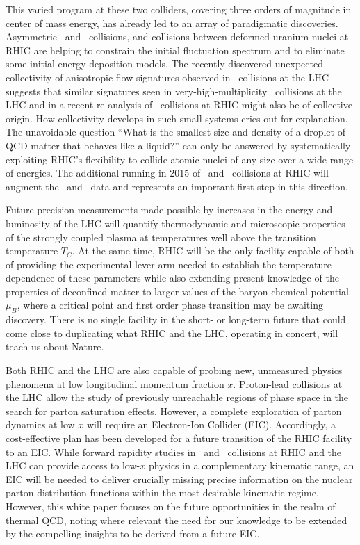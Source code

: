 This varied program at these two colliders, covering three orders of magnitude in center of mass energy, has already led to an array of paradigmatic discoveries. Asymmetric \CuAu\ and \HeAu\ collisions\cite{Huang:2012sc}, and collisions between deformed uranium nuclei at RHIC\cite{Wang:2014qxa} are helping to constrain the initial fluctuation spectrum and to eliminate some initial energy deposition models. The recently discovered unexpected collectivity of anisotropic flow signatures observed in
\pPb\ collisions at the LHC\cite{Abelev:2012ola,Aad:2013fja} suggests that similar signatures seen in very-high-multiplicity \pp\ collisions at the LHC\cite{Khachatryan:2010gv} and in a recent re-analysis of 
\dAu\ collisions at RHIC\cite{Adare:2013piz} might also be of collective origin. How collectivity develops in such small systems cries out for explanation. 
The unavoidable question ``What is the smallest size and density of a droplet of QCD matter that behaves like a liquid?'' can only be answered by systematically exploiting RHIC's flexibility to collide atomic nuclei of any size over a wide range of energies.
The additional running in 2015 of \pAu\ and \pAl\ collisions at RHIC will augment the \dAu\ and \HeAu\ data and represents 
an important first step in this direction.

Future precision measurements made possible by increases in the energy and luminosity of the LHC will quantify thermodynamic and microscopic properties of the strongly coupled plasma at temperatures well above the transition temperature $T_C$. At the same time, RHIC  will be the only facility capable of both of providing the experimental lever arm needed to establish the temperature dependence of these parameters while also extending present knowledge of the properties of deconfined matter to larger values of the baryon chemical potential $\mu_B$, where a critical point and first
order phase transition may be awaiting discovery. There is no single facility in the short- or long-term future that could come close to duplicating what RHIC and the LHC, operating in concert, will teach us about Nature.

Both RHIC and the LHC are also capable of probing new, unmeasured physics phenomena at low longitudinal momentum fraction $x$. Proton-lead collisions at the LHC allow the study of previously unreachable regions of phase space in the search for parton saturation effects. However, a complete exploration of parton dynamics at low $x$ will require an Electron-Ion Collider (EIC). 
Accordingly, a cost-effective plan has been developed for a future transition of the RHIC facility to an EIC. 
While forward rapidity studies in \pA\ and \AplusA\ collisions at RHIC and the LHC can provide access to low-$x$ physics in a complementary kinematic range,
an EIC will be needed to deliver crucially missing precise information on the nuclear parton distribution functions within the most desirable kinematic regime. However, this white paper focuses on the future opportunities in the realm of thermal QCD, noting where relevant the need for our knowledge to be extended by the compelling insights to be derived from a future EIC\cite{Accardi:2012qut}.




